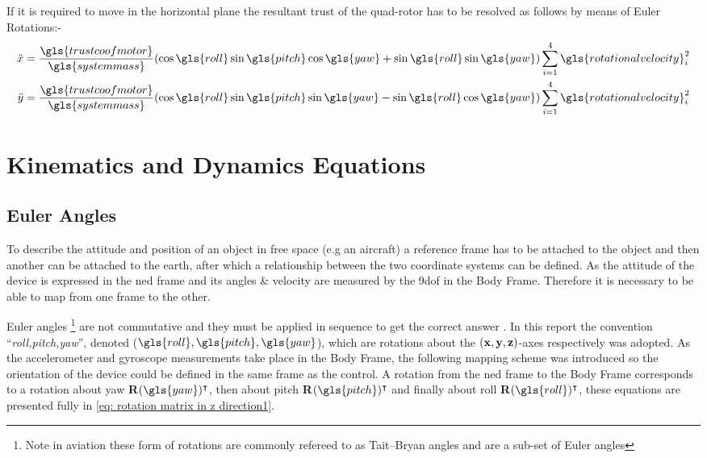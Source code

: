 If it is required to move in the horizontal plane the resultant trust of the quad-rotor has to be resolved as follows by means of Euler Rotations:- \label{Horizontal}
\begin{align}
	\ddot{x} & = \frac{\gls{trustcoofmotor}}{\gls{systemmass}}(\cos\gls{roll}\sin\gls{pitch}\cos\gls{yaw}+ \sin\gls{roll}\sin\gls{yaw} ) \sum_{i=1}^{4} \gls{rotationalvelocity} _i^2 \\
	\ddot{y} & = \frac{\gls{trustcoofmotor}}{\gls{systemmass}}(\cos\gls{roll}\sin\gls{pitch}\sin\gls{yaw} -\sin\gls{roll} \cos\gls{yaw})\sum_{i=1}^{4} \gls{rotationalvelocity} _i^2
\end{align}




\section{Kinematics and Dynamics Equations}

\subsection{Euler Angles} \label{sec: euler angles}
To describe the attitude and position of an object in free space (e.g an aircraft) a reference frame has to be attached to the object and then another can be attached to the earth, after which a relationship between the two coordinate systems can be defined. As the attitude of the device is expressed in the \gls{ned} frame and its angles \& velocity are measured by the \gls{9dof} in the Body Frame. Therefore it is necessary to be able to map from one frame to the other. 

Euler angles \footnote{Note in aviation these form of rotations are commonly refereed to as Tait–Bryan angles and are a sub-set of Euler angles} are not commutative and they must be applied in sequence to get the correct answer \cite[pg. 24]{Stanford_rotation_paper}. In this report the convention  \enquote{\textit{roll,pitch,yaw}}, denoted ($\gls{roll}, \gls{pitch}, \gls{yaw}$), which are rotations about the $(\bf x, y, z)$-axes respectively was adopted. As the accelerometer and gyroscope measurements take place in the Body Frame, the following mapping scheme was introduced so the orientation of the device could be defined in the same frame as the control. A rotation from the \gls{ned} frame to the Body Frame corresponds to a rotation about yaw {\bf R}$(\gls{yaw})^\intercal$, then about pitch {\bf R}$(\gls{pitch})^\intercal$ and finally about roll {\bf R}$(\gls{roll})^\intercal$, these equations are presented fully in \eqref{eq: rotation matrix in z direction1}.     



